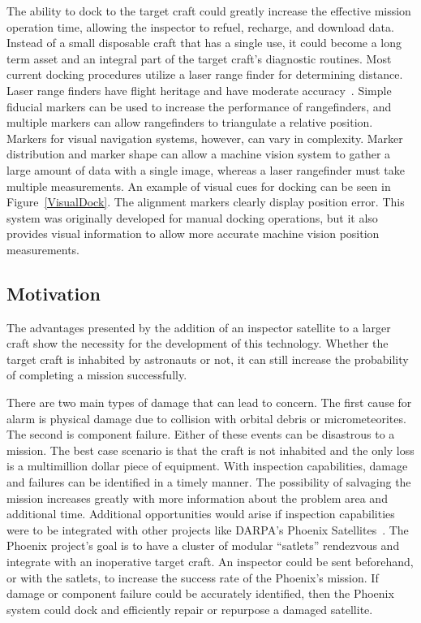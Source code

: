 \documentclass[journal, 10pt]{IEEEtran}
\begin{document}
The ability to dock to the target craft could greatly increase the effective mission operation time, allowing the inspector to refuel, recharge, and download data.  Instead of a small disposable craft that has a single use, it could become a long term asset and an integral part of the target craft's diagnostic routines.  Most current docking procedures utilize a laser range finder for determining distance.  Laser range finders have flight heritage and have moderate accuracy~\cite{Docking}.  Simple fiducial markers can be used to increase the performance of rangefinders, and multiple markers can allow rangefinders to triangulate a relative position.  Markers for visual navigation systems, however, can vary in complexity.  Marker distribution and marker shape can allow a machine vision system to gather a large amount of data with a single image, whereas a laser rangefinder must take multiple measurements.  An example of visual cues for docking can be seen in Figure~\ref{VisualDock}.  The alignment markers clearly display position error.  This system was originally developed for manual docking operations, but it also provides visual information to allow more accurate machine vision position measurements.



\subsection{Motivation}
The advantages presented by the addition of an inspector satellite to a larger craft show the necessity for the development of this technology.  Whether the target craft is inhabited by astronauts or not, it can still increase the probability of completing a mission successfully.

There are two main types of damage that can lead to concern.  The first cause for alarm is physical damage due to collision with orbital debris or micrometeorites.  The second is component failure.  Either of these events can be disastrous to a mission.  The best case scenario is that the craft is not inhabited and the only loss is a multimillion dollar piece of equipment.  With inspection capabilities, damage and failures can be identified in a timely manner.  The possibility of salvaging the mission increases greatly with more information about the problem area and additional time. Additional opportunities would arise if inspection capabilities were to be integrated with other projects like DARPA's Phoenix Satellites~\cite{Phoenix}.  The Phoenix project's goal is to have a cluster of modular ``satlets'' rendezvous and integrate with an inoperative target craft.  An inspector could be sent beforehand, or with the satlets, to increase the success rate of the Phoenix's mission.  If damage or component failure could be accurately identified, then the Phoenix system could dock and efficiently repair or repurpose a damaged satellite.
\end{document}
